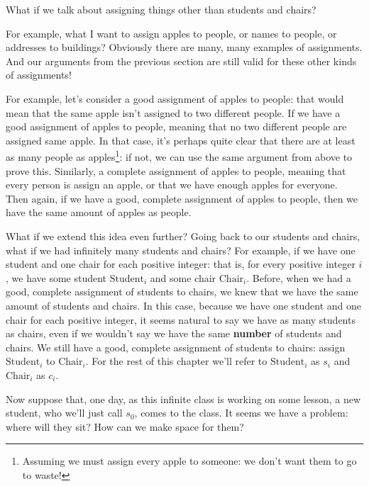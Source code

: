 
What if we talk about assigning things other than students and chairs?

For example, what I want to assign apples to people, or names to people, or addresses to buildings?
Obviously there are many, many examples of assignments.
And our arguments from the previous section are still valid for these other kinds of assignments!

For example, let's consider a good assignment of apples to people: that would mean that the same apple isn't assigned to two different people.
If we have a good assignment of apples to people, meaning that no two different people are assigned same apple.
In that case, it's perhaps quite clear that there are at least as many people as apples\footnote{Assuming we must assign every apple to someone: we don't want them to go to waste!}: if not, we can use the same argument from above to prove this.
Similarly, a complete assignment of apples to people, meaning that every person is assign an apple, or that we have enough apples for everyone.
Then again, if we have a good, complete assignment of apples to people, then we have the same amount of apples as people.

What if we extend this idea even further?
Going back to our students and chairs, what if we had infinitely many students and chairs?
For example, if we have one student and one chair for each  positive integer: that is, for every positive integer $i$, we have some student $\text{Student}_i$ and some chair $\text{Chair}_i$.
Before, when we had a good, complete assignment of students to chairs, we knew that we have the same amount of students and chairs.
In this case, because we have one student and one chair for each positive integer, it seems natural to say we have as many students as chairs, even if we wouldn't say we have the same \textbf{number} of students and chairs.
We still have a good, complete assignment of students to chairs: assign $\text{Student}_i$ to $\text{Chair}_i$.
For the rest of this chapter we'll refer to $\text{Student}_i$ as $s_i$ and $\text{Chair}_i$ as $c_i$.

Now suppose that, one day, as this infinite class is working on some lesson, a new student, who we'll just call $s_0$, comes to the class.
It seems we have a problem: where will they sit?
How can we make space for them?

